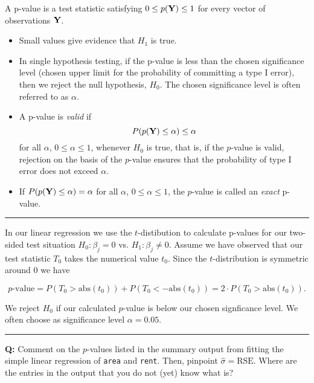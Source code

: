 \documentclass[]{article}
\begin{document}
A p-value is a test statistic satisfying \(0 \leq p({\bf Y}) \leq 1\)
for every vector of observations \({\bf Y}\).

\begin{itemize}
\item
  Small values give evidence that \(H_1\) is true.
\item
  In single hypothesis testing, if the p-value is less than the chosen
  significance level (chosen upper limit for the probability of
  committing a type I error), then we reject the null hypothesis,
  \(H_0\). The chosen significance level is often referred to as
  \(\alpha\).
\item
  A p-value is \emph{valid} if
  \[ P(p({\bf Y}) \leq \alpha) \leq \alpha\] for all \(\alpha\),
  \(0 \leq \alpha \leq 1\), whenever \(H_0\) is true, that is, if the
  \(p\)-value is valid, rejection on the basis of the \(p\)-value
  ensures that the probability of type I error does not exceed
  \(\alpha\).
\item
  If \(P(p({\bf Y}) \leq \alpha) = \alpha\) for all \(\alpha\),
  \(0 \leq \alpha \leq 1\), the \(p\)-value is called an \emph{exact}
  p-value.
\end{itemize}

\begin{center}\rule{0.5\linewidth}{\linethickness}\end{center}

In our linear regression we use the \(t\)-distibution to calculate
p-values for our two-sided test situation \(H_0: \beta_j=0\) vs.
\(H_1: \beta_j \neq 0\). Assume we have observed that our test statistic
\(T_0\) takes the numerical value \(t_0\). Since the \(t\)-distribution
is symmetric around \(0\) we have

\[p\text{-value}=P(T_0>\text{abs}(t_0))+P(T_0<-\text{abs}(t_0))=2\cdot P(T_0>\text{abs}(t_0)).\]

We reject \(H_0\) if our calculated \(p\)-value is below our chosen
signficance level. We often choose as significance level
\(\alpha=0.05\).

\begin{center}\rule{0.5\linewidth}{\linethickness}\end{center}

\textbf{Q:} Comment on the \(p\)-values listed in the summary output
from fitting the simple linear regression of \texttt{area} and
\texttt{rent}. Then, pinpoint \(\hat{\sigma}=\text{RSE}\). Where are the
entries in the output that you do not (yet) know what is?
\end{document}
